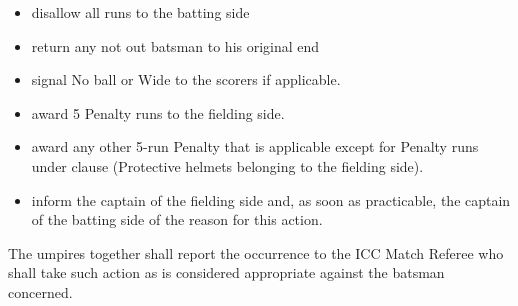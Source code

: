 \documentclass[12pt]{article}
\begin{document}
\vspace{\baselineskip}
\begin{itemize}
	\item {\fontsize{9pt}{10.8pt}\selectfont disallow all runs to the batting side\par}\par


\vspace{\baselineskip}
	\item {\fontsize{9pt}{10.8pt}\selectfont return any not out batsman to his original end\par}\par


\vspace{\baselineskip}
	\item {\fontsize{9pt}{10.8pt}\selectfont signal No ball or Wide to the scorers if applicable.\par}\par


\vspace{\baselineskip}
	\item {\fontsize{9pt}{10.8pt}\selectfont award 5 Penalty runs to the fielding side.\par}\par


\vspace{\baselineskip}
	\item {\fontsize{9pt}{10.8pt}\selectfont award any other 5-run Penalty that is applicable except for Penalty runs under clause (Protective helmets belonging to the fielding side).\par}\par


\vspace{\baselineskip}
	\item {\fontsize{9pt}{10.8pt}\selectfont inform the captain of the fielding side and, as soon as practicable, the captain of the batting side of the reason for this action.\par}
\end{itemize}\par


\vspace{\baselineskip}
\begin{adjustwidth}{0.5in}{0.06in}
{\fontsize{9pt}{10.8pt}\selectfont The umpires together shall report the occurrence to the ICC Match Referee who shall take such action as is considered appropriate against the batsman concerned.\par}\par

\end{adjustwidth}
\end{document}
